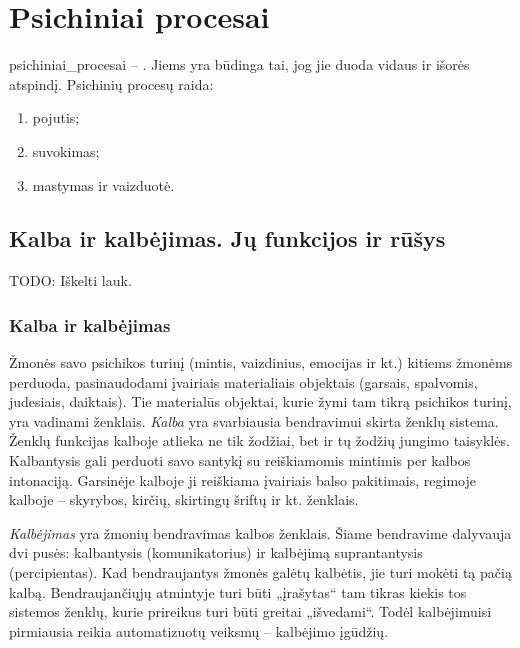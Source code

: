 \chapter{Psichiniai procesai}

\label{tema:psichiniai_procesai}

\Gls{psichiniai_procesai} – . Jiems yra 
būdinga tai, jog jie duoda vidaus ir išorės atspindį. Psichinių procesų
raida:
\begin{enumerate}
  \item \gls{pojutis};
  \item \gls{suvokimas};
  \item \gls{mastymas} ir vaizduotė.
\end{enumerate}

\section{Kalba ir kalbėjimas. Jų funkcijos ir rūšys}

TODO: Iškelti lauk.

\label{tema:kalba_ir_kalbejimas}

\subsection{Kalba ir kalbėjimas}

Žmonės savo psichikos turinį (mintis, vaizdinius, emocijas ir kt.)
kitiems žmonėms perduoda, pasinaudodami įvairiais materialiais objektais
(garsais, spalvomis, judesiais, daiktais). Tie materialūs objektai, kurie
žymi tam tikrą psichikos turinį, yra vadinami ženklais. \emph{Kalba} yra
svarbiausia bendravimui skirta ženklų sistema. Ženklų funkcijas kalboje
atlieka ne tik žodžiai, bet ir tų žodžių jungimo taisyklės. Kalbantysis 
gali perduoti savo santykį su reiškiamomis mintimis per kalbos intonaciją.
Garsinėje kalboje ji reiškiama įvairiais balso pakitimais, regimoje kalboje
– skyrybos, kirčių, skirtingų šriftų ir kt. ženklais.

\emph{Kalbėjimas} yra žmonių bendravimas kalbos ženklais. Šiame bendravime
dalyvauja dvi pusės: kalbantysis (komunikatorius) ir kalbėjimą 
suprantantysis (percipientas). Kad bendraujantys žmonės galėtų kalbėtis, 
jie turi mokėti tą pačią kalbą. Bendraujančiųjų atmintyje turi būti 
„įrašytas“ tam tikras kiekis tos sistemos ženklų, kurie prireikus
turi būti greitai „išvedami“. Todėl kalbėjimuisi pirmiausia reikia 
automatizuotų veiksmų – kalbėjimo įgūdžių.

